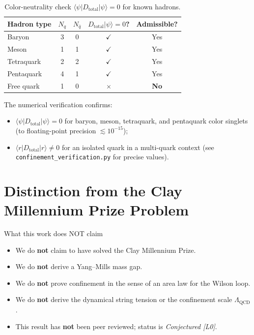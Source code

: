 \documentclass[12pt,a4paper]{article}
\newcommand{\Dtotal}{D_{\mathrm{total}}}
\newcommand{\ket}[1]{|#1\rangle}
\begin{document}
\begin{table}[h]
\centering
\caption{Color-neutrality check $\langle\psi|\Dtotal|\psi\rangle = 0$ for known hadrons.}
\label{tab:hadrons}
\begin{tabular}{lcccc}
\hline
Hadron type & $N_q$ & $N_{\bar{q}}$ & $\Dtotal\ket{\psi}=0$? & Admissible? \\
\hline
Baryon     & 3 & 0 & $\checkmark$ & Yes \\
Meson      & 1 & 1 & $\checkmark$ & Yes \\
Tetraquark & 2 & 2 & $\checkmark$ & Yes \\
Pentaquark & 4 & 1 & $\checkmark$ & Yes \\
\hline
Free quark & 1 & 0 & $\times$ & \textbf{No} \\
\hline
\end{tabular}
\end{table}

The numerical verification confirms:
\begin{itemize}
  \item $\langle\psi|\Dtotal|\psi\rangle = 0$ for baryon, meson, tetraquark, and
    pentaquark color singlets (to floating-point precision $\lesssim 10^{-15}$);
  \item $\langle r|\Dtotal|r\rangle \neq 0$ for an isolated quark in a multi-quark
    context (see \texttt{confinement\_verification.py} for precise values).
\end{itemize}

\section{Distinction from the Clay Millennium Prize Problem}
\label{sec:clay}

\begin{warningbox}{What this work does NOT claim}
\begin{itemize}
  \item We do \textbf{not} claim to have solved the Clay Millennium Prize.
  \item We do \textbf{not} derive a Yang--Mills mass gap.
  \item We do \textbf{not} prove confinement in the sense of an area law for the
    Wilson loop.
  \item We do \textbf{not} derive the dynamical string tension or the confinement
    scale $\Lambda_{\text{QCD}}$.
  \item This result has \textbf{not} been peer reviewed; status is
    \emph{Conjectured [L0]}.
\end{itemize}
\end{warningbox}
\end{document}

